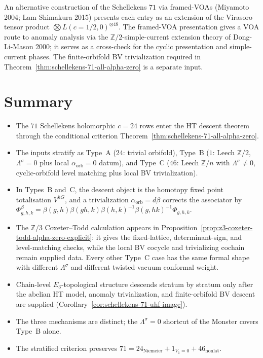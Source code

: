 \begin{remark}
\label{rem:schellekens-framed-voa-crosscheck}
An alternative construction of the Schellekens $71$ via
framed-VOAs (Miyamoto 2004; Lam-Shimakura 2015) presents each entry
as an extension of the Virasoro tensor product
$\bigotimes L(c = 1/2, 0)^{\otimes 48}$. The framed-VOA presentation
gives a VOA route to anomaly analysis via the
$\mathbb{Z}/2$-simple-current extension theory of Dong-Li-Mason 2000;
it serves as a cross-check for the cyclic presentation and
simple-current phases. The finite-orbifold BV trivialization required
in Theorem~\ref{thm:schellekens-71-all-alpha-zero} is a separate
input.
\end{remark}

\section{Summary}
\label{sec:schellekens-71-summary}

\begin{itemize}
\item The $71$ Schellekens holomorphic $c = 24$ rows enter the HT
descent theorem through the conditional criterion
Theorem~\ref{thm:schellekens-71-all-alpha-zero}.
\item The inputs stratify as Type~A ($24$: trivial orbifold),
Type~B ($1$: Leech $\mathbb{Z}/2$, $\Lambda^\sigma = 0$ plus
local $\alpha_{\mathrm{orb}}=0$ datum), and Type~C ($46$: Leech
$\mathbb{Z}/n$ with $\Lambda^\sigma \ne 0$, cyclic-orbifold level
matching plus local BV trivialization).
\item In Types~B and~C, the descent object is the homotopy fixed point
totalisation $V^{hG}$, and a trivialization
$\alpha_{\mathrm{orb}}=d\beta$ corrects the associator by
$\Phi^\beta_{g,h,k}=
\beta(g,h)\beta(gh,k)\beta(h,k)^{-1}\beta(g,hk)^{-1}\Phi_{g,h,k}$.
\item The $\mathbb{Z}/3$ Coxeter--Todd calculation appears in
Proposition~\ref{prop:z3-coxeter-todd-alpha-zero-explicit}: it gives
the fixed-lattice, determinant-sign, and level-matching checks, while
the local BV cocycle and trivializing cochain remain supplied data.
Every other Type~C case has the same formal shape with different
$\Lambda^\sigma$ and different twisted-vacuum conformal weight.
\item Chain-level $E_3$-topological structure descends stratum by
stratum only after the abelian HT model, anomaly trivialization, and
finite-orbifold BV descent are supplied
(Corollary~\ref{cor:schellekens-71-uhf-image}).
\item The three mechanisms are distinct; the
$\Lambda^\sigma = 0$ shortcut of the Monster covers Type~B alone.
\item The stratified criterion preserves
$71 = 24_{\mathrm{Niemeier}} + 1_{V_1=0} + 46_{\mathrm{nonlat}}$.
\end{itemize}
